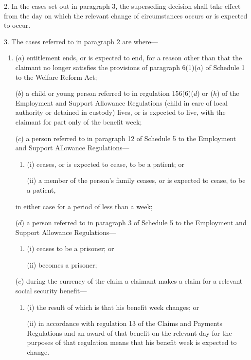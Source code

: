 \documentclass[12pt,a4paper]{article}
\begin{document}
\medskip

2.  In the cases set out in paragraph 3, the superseding decision shall take effect from the day on which the relevant change of circumstances occurs or is expected to occur.

\medskip

3.  The cases referred to in paragraph 2 are where—
\begin{enumerate}\item[]
($a$) entitlement ends, or is expected to end, for a reason other than that the claimant no longer satisfies the provisions of paragraph 6(1)($a$)  of Schedule 1 to the Welfare Reform Act;

($b$) a child or young person referred to in regulation 156(6)($d$)  or ($h$)  of the Employment and Support Allowance Regulations (child in care of local authority or detained in custody) lives, or is expected to live, with the claimant for part only of the benefit week;

($c$) a person referred to in paragraph 12 of Schedule 5 to the Employment and Support Allowance Regulations—
\begin{enumerate}\item[]
(i) ceases, or is expected to cease, to be a patient; or

(ii) a member of the person’s family ceases, or is expected to cease, to be a patient,
\end{enumerate}
in either case for a period of less than a week;

($d$) a person referred to in paragraph 3 of Schedule 5 to the Employment and Support Allowance Regulations—
\begin{enumerate}\item[]
(i) ceases to be a prisoner; or

(ii) becomes a prisoner;
\end{enumerate}

($e$) during the currency of the claim a claimant makes a claim for a relevant social security benefit—
\begin{enumerate}\item[]
(i) the result of which is that his benefit week changes; or

(ii) in accordance with regulation 13 of the Claims and Payments Regulations and an award of that benefit on the relevant day for the purposes of that regulation means that his benefit week is expected to change.
\end{enumerate}
\end{enumerate}
\end{document}
